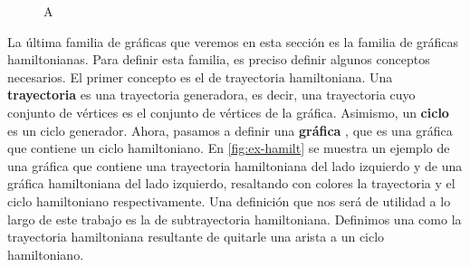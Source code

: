 \begin{figure}[ht!]
    \centering
\caption{A}
\label{fig:ex-abanico}
\end{figure}


La \'ultima familia de gr\'aficas que veremos en esta secci\'on es la familia de
gr\'aficas hamiltonianas. Para definir esta familia, es preciso definir algunos
conceptos necesarios. El primer concepto es el de trayectoria hamiltoniana. Una
\textbf{trayectoria}
 es una
trayectoria generadora, es decir, una trayectoria cuyo conjunto de v\'ertices es
el conjunto de v\'ertices de la gr\'afica. Asimismo, un \textbf{ciclo}
 es un ciclo generador.
Ahora, pasamos a definir una \textbf{gr\'afica}
, que es una
gr\'afica que contiene un ciclo hamiltoniano. En \cref{fig:ex-hamilt} se muestra
un ejemplo de una gr\'afica que contiene una trayectoria hamiltoniana del lado
izquierdo y de una gr\'afica hamiltoniana del lado izquierdo, resaltando con
colores la trayectoria y el ciclo hamiltoniano respectivamente. Una definici\'on
que nos ser\'a de utilidad a lo largo de este trabajo es la de subtrayectoria
hamiltoniana. Definimos una  como la trayectoria
hamiltoniana resultante de quitarle una arista a un ciclo hamiltoniano. 

